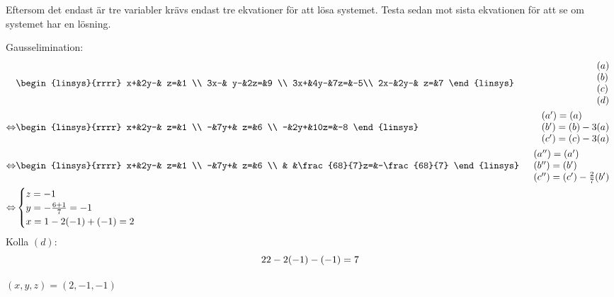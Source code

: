 \begin{task}{1.10}
	Eftersom det endast är tre variabler krävs endast tre ekvationer för att lösa systemet. Testa sedan mot sista ekvationen för att se om systemet har en lösning.
	
	Gausselimination:
	\begin{align*}
		&\begin{linsys}{rrrr}
			 x+&2y-& z=&1 \\
			3x-& y-&2z=&9 \\
			3x+&4y-&7z=&-5\\
			2x-&2y-& z=&7
		\end{linsys}
		&\begin{array}{l} 
			(a) \\ 
			(b) \\
			(c) \\
			(d)
		\end{array} \\ \lra
		&\begin{linsys}{rrrr}
			x+&2y-&  z=&1 \\
			 -&7y+&  z=&6 \\
			 -&2y+&10z=&-8
		\end{linsys}
		&\begin{array}{l} 
			(a')=(a) \\ 
			(b')=(b)-3(a) \\
			(c')=(c)-3(a)
		\end{array} \\ \lra
		&\begin{linsys}{rrrr}
			x+&2y-&  z=&1 \\
			 -&7y+&  z=&6 \\
			  &   &\frac{68}{7}z=&-\frac{68}{7}
		\end{linsys}
		&\begin{array}{l} 
			(a'')=(a') \\ 
			(b'')=(b') \\
			(c'')=(c')-\frac{2}{7}(b')
		\end{array} \\ \lra
		&\begin{cases}
			z=-1 \\
			y=-\frac{6+1}{7}=-1 \\
			x=1-2\*(-1)+(-1)=2
		\end{cases}
	\end{align*}
	Kolla $(d)$:
	\[2\*2-2\*(-1)-(-1)=7\]
	
	\ans $(x,y,z)=(2,-1,-1)$
\end{task}

